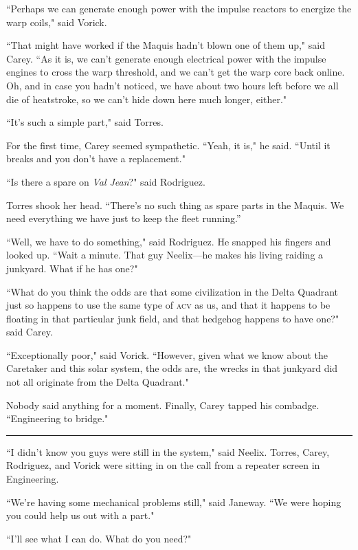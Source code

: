 \documentclass[twoside,letterpaper,12pt]{memoir}
\begin{document}
``Perhaps we can generate enough power with the impulse reactors to energize the warp coils," said Vorick.

``That might have worked if the Maquis hadn't blown one of them up," said Carey. ``As it is, we can't generate enough electrical power with the impulse engines to cross the warp threshold, and we can't get the warp core back online. Oh, and in case you hadn't noticed, we have about two hours left before we all die of heatstroke, so we can't hide down here much longer, either."

``It's such a simple part," said Torres.

For the first time, Carey seemed sympathetic. ``Yeah, it is," he said. ``Until it breaks and you don't have a replacement."

``Is there a spare on \textit{Val Jean}?" said Rodriguez.

Torres shook her head. ``There’s no such thing as spare parts in the Maquis. We need everything we have just to keep the fleet running.”

``Well, we have to do something," said Rodriguez. He snapped his fingers and looked up. ``Wait a minute. That guy Neelix---he makes his living raiding a junkyard. What if he has one?"

``What do you think the odds are that some civilization in the Delta Quadrant just so happens to use the same type of \textsc{acv} as us, and that it happens to be floating in that particular junk field, and that hedgehog happens to have one?" said Carey.

``Exceptionally poor," said Vorick. ``However, given what we know about the Caretaker and this solar system, the odds are, the wrecks in that junkyard did not all originate from the Delta Quadrant."

Nobody said anything for a moment. Finally, Carey tapped his combadge. ``Engineering to bridge."

\begin{center}\rule{3cm}{0.4 pt}\end{center}

``I didn't know you guys were still in the system," said Neelix. Torres, Carey, Rodriguez, and Vorick were sitting in on the call from a repeater screen in Engineering.

``We're having some mechanical problems still," said Janeway. ``We were hoping you could help us out with a part."

``I'll see what I can do. What do you need?"
\end{document}
